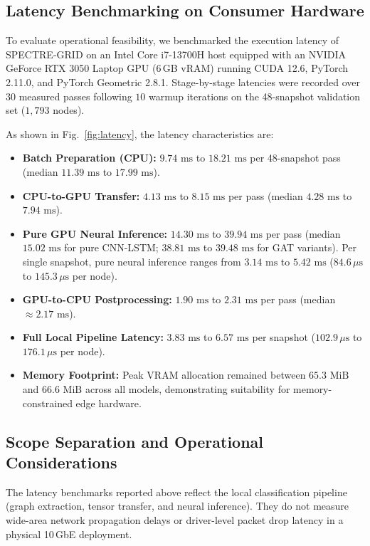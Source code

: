 \documentclass[conference]{IEEEtran}
\begin{document}
\subsection{Latency Benchmarking on Consumer Hardware}
To evaluate operational feasibility, we benchmarked the execution latency of SPECTRE-GRID on an Intel Core i7-13700H host equipped with an NVIDIA GeForce RTX 3050 Laptop GPU (6\,GB vRAM) running CUDA 12.6, PyTorch 2.11.0, and PyTorch Geometric 2.8.1. Stage-by-stage latencies were recorded over $30$ measured passes following $10$ warmup iterations on the 48-snapshot validation set ($1{,}793$ nodes).

As shown in Fig.~\ref{fig:latency}, the latency characteristics are:
\begin{itemize}
    \item \textbf{Batch Preparation (CPU):} $9.74\text{ ms}$ to $18.21\text{ ms}$ per 48-snapshot pass (median $11.39\text{ ms}$ to $17.99\text{ ms}$).
    \item \textbf{CPU-to-GPU Transfer:} $4.13\text{ ms}$ to $8.15\text{ ms}$ per pass (median $4.28\text{ ms}$ to $7.94\text{ ms}$).
    \item \textbf{Pure GPU Neural Inference:} $14.30\text{ ms}$ to $39.94\text{ ms}$ per pass (median $15.02\text{ ms}$ for pure CNN-LSTM; $38.81\text{ ms}$ to $39.48\text{ ms}$ for GAT variants). Per single snapshot, pure neural inference ranges from $3.14\text{ ms}$ to $5.42\text{ ms}$ ($84.6\,\mu\text{s}$ to $145.3\,\mu\text{s}$ per node).
    \item \textbf{GPU-to-CPU Postprocessing:} $1.90\text{ ms}$ to $2.31\text{ ms}$ per pass (median $\approx 2.17\text{ ms}$).
    \item \textbf{Full Local Pipeline Latency:} $3.83\text{ ms}$ to $6.57\text{ ms}$ per snapshot ($102.9\,\mu\text{s}$ to $176.1\,\mu\text{s}$ per node).
    \item \textbf{Memory Footprint:} Peak VRAM allocation remained between $65.3\text{ MiB}$ and $66.6\text{ MiB}$ across all models, demonstrating suitability for memory-constrained edge hardware.
\end{itemize}

\subsection{Scope Separation and Operational Considerations}
The latency benchmarks reported above reflect the local classification pipeline (graph extraction, tensor transfer, and neural inference). They do not measure wide-area network propagation delays or driver-level packet drop latency in a physical 10\,GbE deployment.
\end{document}
